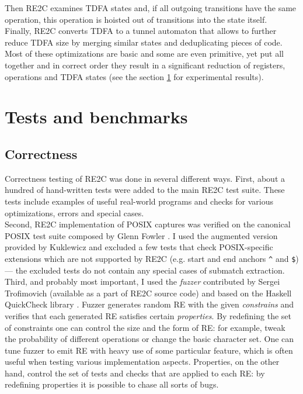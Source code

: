 \documentclass{article}
\theoremstyle{definition}
\begin{document}
\begin{multicols}{2}
Then RE2C examines TDFA states and, if all outgoing transitions have the same operation,
this operation is hoisted out of transitions into the state itself.
\\

Finally, RE2C converts TDFA to a tunnel automaton \cite{Gro89}
that allows to further reduce TDFA size by merging similar states and deduplicating pieces of code.
\\

Most of these optimizations are basic and some are even primitive, yet put all together and in correct order
they result in a significant reduction of registers, operations and TDFA states
(see the section \ref{section_tests_and_benchmarks} for experimental results).

\section{Tests and benchmarks}\label{section_tests_and_benchmarks}

\subsection*{Correctness}

Correctness testing of RE2C was done in several different ways.
First, about a hundred of hand-written tests were added to the main RE2C test suite.
These tests include examples of useful real-world programs
and checks for various optimizations, errors and special cases.
\\

Second, RE2C implementation of POSIX captures was verified on the canonical POSIX test suite composed by Glenn Fowler \cite{Fow03}.
I used the augmented version provided by Kuklewicz \cite{Kuk09} and excluded a few tests that check POSIX-specific extensions
which are not supported by RE2C (e.g. start and end anchors \texttt{\^} and \texttt{\$}) ---
the excluded tests do not contain any special cases of submatch extraction.
\\

Third, and probably most important, I used the \emph{fuzzer} contributed by Sergei Trofimovich
(available as a part of RE2C source code)
and based on the Haskell QuickCheck library \cite{CH11}.
Fuzzer generates random RE with the given \emph{constrains}
and verifies that each generated RE satisfies certain \emph{properties}.
By redefining the set of constraints one can control the size and the form of RE:
for example, tweak the probability of different operations or change the basic character set.
One can tune fuzzer to emit RE with heavy use of some particular feature,
which is often useful when testing various implementation aspects.
Properties, on the other hand, control the set of tests and checks that are applied to each RE:
by redefining properties it is possible to chase all sorts of bugs.
\\


\end{multicols}
\end{document}
